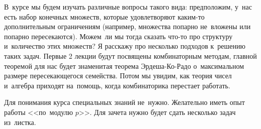 



В~курсе мы будем изучать различные вопросы такого вида: предположим, у~нас есть
набор конечных множеств, которые удовлетворяют каким-то дополнительным
ограничениям (например, множества попарно не~вложены или попарно пересекаются).
Можем~ли мы тогда сказать что-то про структуру и~количество этих множеств?
Я расскажу про несколько подходов к~решению таких задач.
Первые 2 лекции будут посвящены комбинаторным методам, главной теоремой для нас
будет знаменитая теорема Эрдеша-Ко-Радо о~максимальном размере пересекающегося
семейства.
Потом мы увидим, как теория чисел и~алгебра приходят на~помощь, когда
комбинаторика перестает работать.

Для понимания курса специальных знаний не~нужно.
Желательно иметь опыт работы <<по~модулю $p$>>.
Для зачета нужно будет сдать несколько задач из~листка.
 
